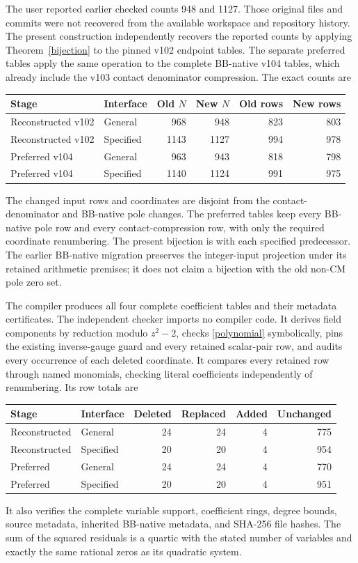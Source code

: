 \documentclass[11pt]{article}
\begin{document}
The user reported earlier checked counts 948 and 1127. Those
original files and commits were not recovered from the available
workspace and repository history. The present construction
independently recovers the reported counts by applying
Theorem~\ref{bijection} to the pinned v102 endpoint tables. The
separate preferred tables apply the same operation to the complete
BB-native v104 tables, which already include the v103 contact
denominator compression. The exact counts are
\begin{center}
\begin{tabular}{@{}llrrrr@{}}
\toprule
Stage & Interface & Old $N$ & New $N$ & Old rows & New rows\\
\midrule
Reconstructed v102 & General &968&948&823&803\\
Reconstructed v102 & Specified &1143&1127&994&978\\
Preferred v104 & General &963&943&818&798\\
Preferred v104 & Specified &1140&1124&991&975\\
\bottomrule
\end{tabular}
\end{center}
The changed input rows and coordinates are disjoint from the
contact-denominator and BB-native pole changes. The preferred
tables keep every BB-native pole row and every contact-compression
row, with only the required coordinate renumbering. The present
bijection is with each specified predecessor. The earlier
BB-native migration preserves the integer-input projection under
its retained arithmetic premises; it does not claim a bijection
with the old non-CM pole zero set.

The compiler produces all four complete coefficient tables and
their metadata certificates. The independent checker imports no
compiler code. It derives field components by reduction modulo
$z^2-2$, checks \eqref{polynomial} symbolically, pins the existing
inverse-gauge guard and every retained scalar-pair row, and audits
every occurrence of each deleted coordinate. It compares every
retained row through named monomials, checking literal coefficients
independently of renumbering. Its row totals are
\begin{center}
\begin{tabular}{@{}llrrrr@{}}
\toprule
Stage & Interface & Deleted & Replaced & Added & Unchanged\\
\midrule
Reconstructed & General &24&24&4&775\\
Reconstructed & Specified &20&20&4&954\\
Preferred & General &24&24&4&770\\
Preferred & Specified &20&20&4&951\\
\bottomrule
\end{tabular}
\end{center}
It also verifies the complete variable support, coefficient
rings, degree bounds, source metadata, inherited BB-native
metadata, and SHA-256 file hashes. The sum of the squared
residuals is a quartic with the stated number of variables and
exactly the same rational zeros as its quadratic system.
\end{document}
